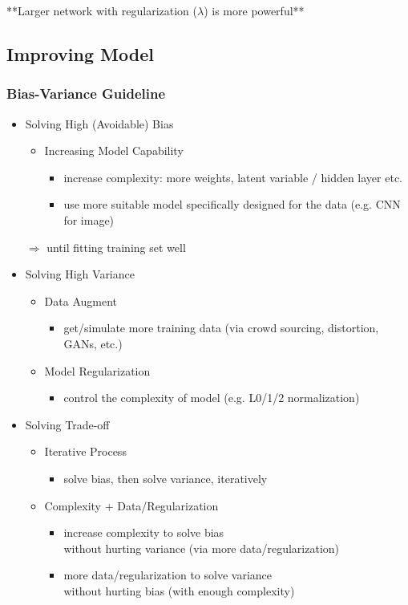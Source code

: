 **Larger network with regularization ($\lambda$) is more powerful**

\subsection{Improving Model}

\subsubsection{Bias-Variance Guideline}
\begin{itemize}
\item Solving High (Avoidable) Bias
	\begin{itemize}
	\item Increasing Model Capability
		\begin{itemize}
		\item increase complexity: more weights, latent variable / hidden layer etc.
		\item use more suitable model specifically designed for the data (e.g. CNN for image)
		\end{itemize}
	\end{itemize}
	$\Rightarrow$ until fitting training set well
\item Solving High Variance
	\begin{itemize}
	\item Data Augment
		\begin{itemize}
		\item get/simulate more training data (via crowd sourcing, distortion, GANs, etc.)
		\end{itemize}
	\item Model Regularization
		\begin{itemize}
		\item control the complexity of model (e.g. L0/1/2 normalization)
		\end{itemize}
	\end{itemize}
\item Solving Trade-off
	\begin{itemize}
	\item Iterative Process
		\begin{itemize}
		\item solve bias, then solve variance, iteratively
		\end{itemize}
	\item Complexity + Data/Regularization
		\begin{itemize}
		\item increase complexity to solve bias \\
		without hurting variance (via more data/regularization)
		\item more data/regularization to solve variance \\
		without hurting bias (with enough complexity)
		\end{itemize}
	\end{itemize}
\end{itemize}

